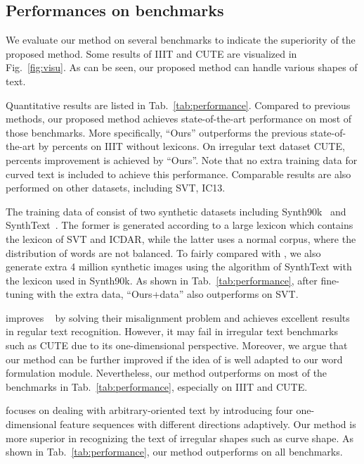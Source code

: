 \documentclass[letterpaper]{article} \usepackage{aaai19}  \usepackage{times}  \usepackage{helvet}  \usepackage{courier}  \usepackage{url}  \usepackage{graphicx}  \frenchspacing  \usepackage{multirow}
\begin{document}
\subsection{Performances on benchmarks}
We evaluate our method on several benchmarks to indicate the superiority of the proposed method. Some results of IIIT and CUTE are visualized in Fig.~\ref{fig:visu}. As can be seen, our proposed method can handle various shapes of text. 

Quantitative results are listed in Tab.~\ref{tab:performance}. Compared to previous methods, our proposed method achieves state-of-the-art performance on most of those benchmarks. More specifically, ``Ours'' outperforms the previous state-of-the-art by  percents on IIIT without lexicons. On irregular text dataset CUTE,  percents improvement is achieved by ``Ours''. Note that no extra training data for curved text is included to achieve this performance. Comparable results are also performed on other datasets, including SVT, IC13. 

The training data of \cite{ChengBXZPZ17} consist of two synthetic datasets including Synth90k~\cite{synth90} and SynthText~\cite{gupta2016synthetic}. The former is generated according to a large lexicon which contains the lexicon of SVT and ICDAR, while the latter uses a normal corpus, where the distribution of words are not balanced. To fairly compared with \cite{ChengBXZPZ17}, we also generate extra 4 million synthetic images using the algorithm of SynthText with the lexicon used in Synth90k. As shown in Tab.~\ref{tab:performance}, after fine-tuning with the extra data, ``Ours+data'' also outperforms \cite{ChengBXZPZ17} on SVT.

\cite{bai2018edit} improves ~\cite{ChengBXZPZ17,DBLP:conf/cvpr/ShiWLYB16} by solving their misalignment problem and achieves excellent results in regular text recognition. However, it may fail in irregular text benchmarks such as CUTE due to its one-dimensional perspective. Moreover, we argue that our method can be further improved if the idea of \cite{bai2018edit} is well adapted to our word formulation module. Nevertheless, our method outperforms \cite{bai2018edit} on most of the benchmarks in Tab.~\ref{tab:performance}, especially on IIIT and CUTE. 

\cite{cheng2018aon} focuses on dealing with arbitrary-oriented text by introducing four one-dimensional feature sequences with different directions adaptively. Our method is more superior in recognizing the text of irregular shapes such as curve shape. As shown in Tab.~\ref{tab:performance}, our method outperforms \cite{cheng2018aon} on all benchmarks.
\end{document}
